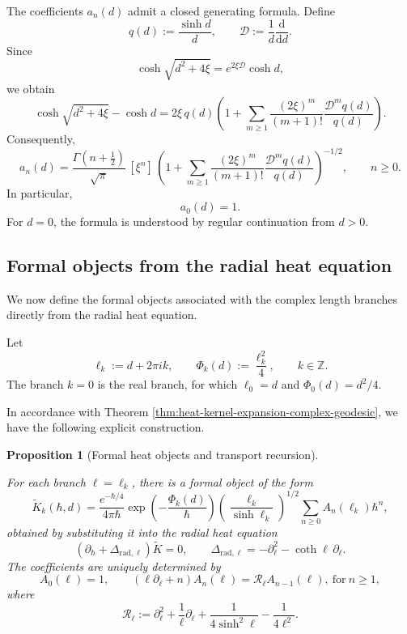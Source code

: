 \documentclass[11pt]{amsart}
\theoremstyle{plain}
\newtheorem{prop}[thm]{Proposition}
\theoremstyle{definition}
\newcommand{\Z}{\mathbb Z}
\newcommand{\dd}{\mathrm d}
\begin{document}
The coefficients $a_n(d)$ admit a closed generating formula.  Define
\[
q(d):=\frac{\sinh d}{d},
\qquad\mathcal D:=\frac1d\frac{\dd}{\dd d}.
\]
Since
\[
\cosh\sqrt{d^2+4\xi}=e^{2\xi\mathcal D}\cosh d,
\]
we obtain
\[
\cosh\sqrt{d^2+4\xi}-\cosh d
=2\xi\,q(d)\left(1+\sum_{m\ge1}
\frac{(2\xi)^m}{(m+1)!}
\frac{\mathcal D^m q(d)}{q(d)}\right).
\]
Consequently,
\begin{equation*}\label{eq:H2-an-closed-formula}
a_n(d)=\frac{\Gamma\!\left(n+\frac12\right)}{\sqrt{\pi}}\,[\xi^n]\,\left(1+\sum_{m\ge1}
\frac{(2\xi)^m}{(m+1)!}\frac{\mathcal D^m q(d)}{q(d)}\right)^{-1/2},\qquad n\ge0.
\end{equation*}
In particular,
\[a_0(d)=1.\]
For $d=0$, the formula is understood by regular continuation from $d>0$.

\subsection{Formal objects from the radial heat equation}

We now define the formal objects associated with the complex length branches
directly from the radial heat equation.

Let
\[
\ell_k:=d+2\pi ik,\qquad\Phi_k(d):=\frac{\ell_k^2}{4},
\qquad k\in\Z.
\]
The branch $k=0$ is the real branch, for which $\ell_0=d$ and
$\Phi_0(d)=d^2/4$.

In accordance with Theorem \ref{thm:heat-kernel-expansion-complex-geodesic}, we have the following explicit construction. 

\begin{prop}[Formal heat objects and transport recursion]
\label{prop:H2-formal-heat-recursion}

For each branch $\ell=\ell_k$, there is a formal object of the form
\begin{equation}\label{eq:H2-formal-heat-object-k}
\widetilde{K}_k(\hbar,d)
=
\frac{e^{-\hbar/4}}{4\pi\hbar}
\exp\!\left(-\frac{\Phi_k(d)}{\hbar}\right)
\left(\frac{\ell_k}{\sinh\ell_k}\right)^{1/2}
\sum_{n\ge0}A_n(\ell_k)\hbar^n,
\end{equation}
obtained by substituting it 
into the radial heat equation 
\[
(\partial_\hbar+\Delta_{\mathrm{rad},\ell})
\widetilde{K}=0,\qquad 
\Delta_{\mathrm{rad},\ell}=-\partial_\ell^2-\coth \ell\,\partial_\ell.
\]
The coefficients are uniquely determined by
\begin{equation}\label{eq:H2-transport-recursion-An}
A_0(\ell)=1,\qquad \left(\ell\partial_\ell+n\right)A_n(\ell) 
=\mathcal R_\ell A_{n-1}(\ell),\ \text{for} \  n\geq1,
\end{equation}
where
\[
\mathcal R_\ell:=\partial_\ell^2+\frac1\ell\partial_\ell
+\frac{1}{4\sinh^2\ell}-\frac{1}{4\ell^2}.
\]
\end{prop}
\end{document}

